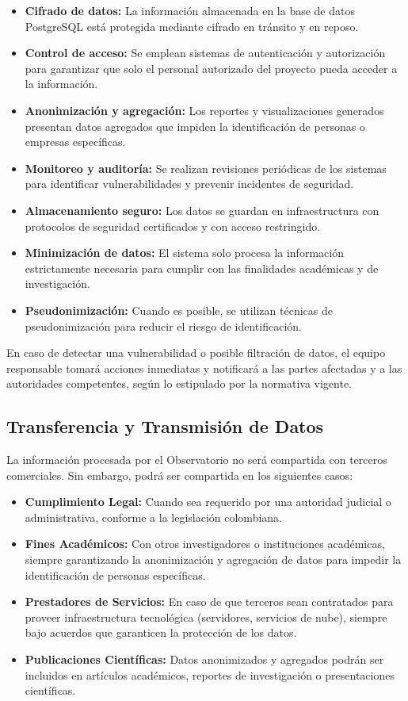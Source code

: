 \documentclass[11pt,oneside,letterpaper]{article}
\begin{document}
\begin{itemize}
    \item \textbf{Cifrado de datos:} La información almacenada en la base de datos PostgreSQL está protegida mediante cifrado en tránsito y en reposo.
    \item \textbf{Control de acceso:} Se emplean sistemas de autenticación y autorización para garantizar que solo el personal autorizado del proyecto pueda acceder a la información.
    \item \textbf{Anonimización y agregación:} Los reportes y visualizaciones generados presentan datos agregados que impiden la identificación de personas o empresas específicas.
    \item \textbf{Monitoreo y auditoría:} Se realizan revisiones periódicas de los sistemas para identificar vulnerabilidades y prevenir incidentes de seguridad.
    \item \textbf{Almacenamiento seguro:} Los datos se guardan en infraestructura con protocolos de seguridad certificados y con acceso restringido.
    \item \textbf{Minimización de datos:} El sistema solo procesa la información estrictamente necesaria para cumplir con las finalidades académicas y de investigación.
    \item \textbf{Pseudonimización:} Cuando es posible, se utilizan técnicas de pseudonimización para reducir el riesgo de identificación.
\end{itemize}

En caso de detectar una vulnerabilidad o posible filtración de datos, el equipo responsable tomará acciones inmediatas y notificará a las partes afectadas y a las autoridades competentes, según lo estipulado por la normativa vigente.

\subsection{Transferencia y Transmisión de Datos}

La información procesada por el Observatorio no será compartida con terceros comerciales. Sin embargo, podrá ser compartida en los siguientes casos:

\begin{itemize}
    \item \textbf{Cumplimiento Legal:} Cuando sea requerido por una autoridad judicial o administrativa, conforme a la legislación colombiana.
    \item \textbf{Fines Académicos:} Con otros investigadores o instituciones académicas, siempre garantizando la anonimización y agregación de datos para impedir la identificación de personas específicas.
    \item \textbf{Prestadores de Servicios:} En caso de que terceros sean contratados para proveer infraestructura tecnológica (servidores, servicios de nube), siempre bajo acuerdos que garanticen la protección de los datos.
    \item \textbf{Publicaciones Científicas:} Datos anonimizados y agregados podrán ser incluidos en artículos académicos, reportes de investigación o presentaciones científicas.
\end{itemize}
\end{document}
